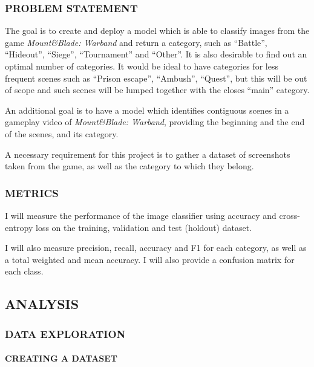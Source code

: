 \documentclass[
]{article}
\begin{document}
\newpage


\hypertarget{problem-statement}{%
\subsubsection{PROBLEM STATEMENT}\label{problem-statement}}

The goal is to create and deploy a model which is able to classify
images from the game \emph{Mount\&Blade: Warband} and return a category,
such as ``Battle'', ``Hideout'', ``Siege'', ``Tournament'' and
``Other''. It is also desirable to find out an optimal number of
categories. It would be ideal to have categories for less frequent
scenes such as ``Prison escape'', ``Ambush'', ``Quest'', but this will
be out of scope and such scenes will be lumped together with the closes
``main'' category.

An additional goal is to have a model which identifies contiguous scenes
in a gameplay video of \emph{Mount\&Blade: Warband}, providing the
beginning and the end of the scenes, and its category.

A necessary requirement for this project is to gather a dataset of
screenshots taken from the game, as well as the category to which they
belong.

\hypertarget{metrics}{%
\subsubsection{METRICS}\label{metrics}}

I will measure the performance of the image classifier using accuracy
and cross-entropy loss on the training, validation and test (holdout)
dataset.

I will also measure precision, recall, accuracy and F1 for each
category, as well as a total weighted and mean accuracy. I will also
provide a confusion matrix for each class.

\hypertarget{analysis}{%
\subsection{ANALYSIS}\label{analysis}}

\hypertarget{data-exploration}{%
\subsubsection{DATA EXPLORATION}\label{data-exploration}}

\hypertarget{creating-a-dataset}{%
\paragraph{CREATING A DATASET}\label{creating-a-dataset}}
\end{document}
